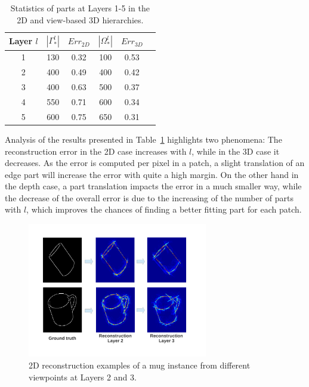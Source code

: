 \documentclass[runningheads]{llncs}
\begin{document}
 \begin{table}
 \begin{center}
  \begin{tabular}{ | c | c | c | c | c |r |}
      \hline
      Layer $l$  & $|\Gamma_*^l|$ & $Err_{2D}$ &  $|\Omega_*^l|$ & $Err_{3D}$ \\ \hline
    1 &  130 & 0.32 & 100 & 0.53 \\ \hline
    2 &  400 & 0.49 & 400 & 0.42 \\ \hline
    3 &  400 & 0.63 & 500 & 0.37  \\ \hline 
    4 &  550 & 0.71 & 600 & 0.34  \\ \hline
    5 &  600 & 0.75 & 650 & 0.31 \\ \hline
  \end{tabular}
\end{center}
 \caption{Statistics of parts at Layers 1-5 in the 2D and view-based 3D hierarchies.}
 \label{tab:stats}
\end{table}

Analysis of the results presented in Table~\ref{tab:stats} highlights two phenomena: The reconstruction error in the 2D case increases with $l$, while in the 3D case it decreases. As the error is computed per pixel in a patch, a slight translation of an edge part will increase the error with quite a high margin. On the other hand in the depth case, a part translation impacts the error in a much smaller way, while the decrease of the overall error is due to the increasing of the number of parts with $l$, which improves the chances of finding a better fitting part for each patch. 

\begin{figure}
\begin{center}
\includegraphics[width=0.7\textwidth]{reconstruction_edge}
\end{center}
\caption{2D reconstruction examples of a mug instance from different viewpoints at Layers 2 and 3.}
\label{reconstructionEdge}
\end{figure}
\end{document}
